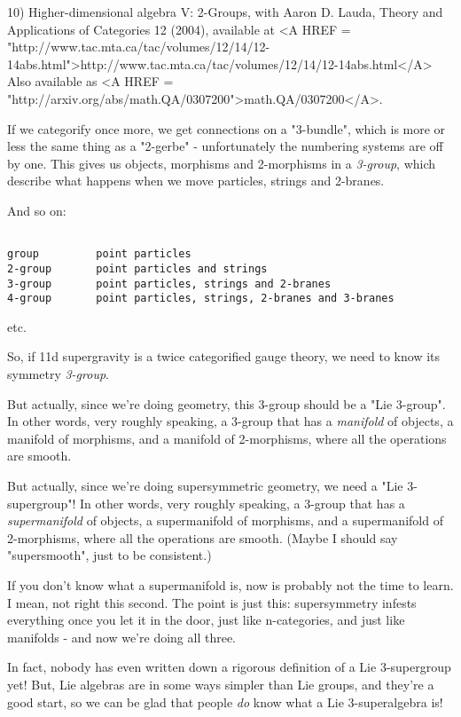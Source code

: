 10) Higher-dimensional algebra V: 2-Groups, with Aaron D. Lauda, 
Theory and Applications of Categories 12 (2004), available at
<A HREF = "http://www.tac.mta.ca/tac/volumes/12/14/12-14abs.html">http://www.tac.mta.ca/tac/volumes/12/14/12-14abs.html</A>  
Also available as <A HREF = "http://arxiv.org/abs/math.QA/0307200">math.QA/0307200</A>.

If we categorify once more, we get connections on a "3-bundle",
which is more or less the same thing as a "2-gerbe" - unfortunately
the numbering systems are off by one.   This gives us objects,
morphisms and 2-morphisms in a \emph{3-group}, which describe what 
happens when we move particles, strings and 2-branes.

And so on:


\begin{verbatim}

group         point particles
2-group       point particles and strings
3-group       point particles, strings and 2-branes
4-group       point particles, strings, 2-branes and 3-branes
\end{verbatim}
    
etc.  

So, if 11d supergravity is a twice categorified gauge theory,
we need to know its symmetry \emph{3-group}.  

But actually, since we're doing geometry, this 3-group should
be a "Lie 3-group".  In other words, very roughly speaking, 
a 3-group that has a \emph{manifold} of objects, a manifold of 
morphisms, and a manifold of 2-morphisms, where all the 
operations are smooth.

But actually, since we're doing supersymmetric geometry, we
need a "Lie 3-supergroup"!  In other words, very roughly
speaking, a 3-group that has a \emph{supermanifold} of objects, 
a supermanifold of morphisms, and a supermanifold of 2-morphisms, 
where all the operations are smooth.  (Maybe I should say 
"supersmooth", just to be consistent.)

If you don't know what a supermanifold is, now is probably 
not the time to learn.  I mean, not right this second.
The point is just this: supersymmetry 
infests everything once you let it in the door, just like 
n-categories, and just like manifolds - and now we're doing all three.   

In fact, nobody has even written down a rigorous definition
of a Lie 3-supergroup yet!  But, Lie algebras are in some ways 
simpler than Lie groups, and they're a good start, so we can
be glad that people \emph{do} know what a Lie 3-superalgebra is!

